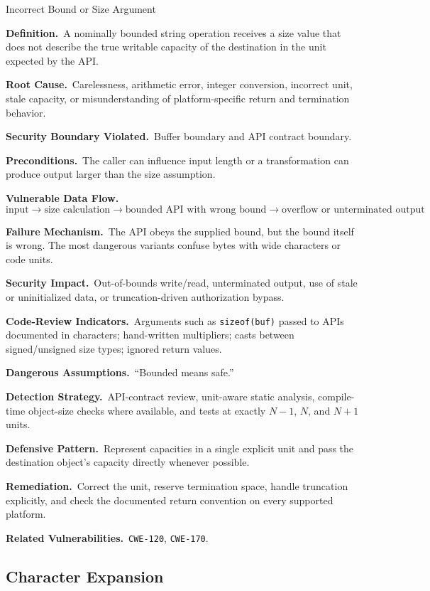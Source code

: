 \documentclass[11pt]{article}
\newcommand{\field}[1]{\par\smallskip\noindent\textbf{#1.}\ }
\newcommand{\cwe}[1]{\texttt{#1}}
\begin{document}
\begin{catalogbox}{Incorrect Bound or Size Argument}
\field{Definition}A nominally bounded string operation receives a size value that does not describe the true writable capacity of the destination in the unit expected by the API.

\field{Root Cause}Carelessness, arithmetic error, integer conversion, incorrect unit, stale capacity, or misunderstanding of platform-specific return and termination behavior.

\field{Security Boundary Violated}Buffer boundary and API contract boundary.

\field{Preconditions}The caller can influence input length or a transformation can produce output larger than the size assumption.

\field{Vulnerable Data Flow}
\[
\text{input} \rightarrow \text{size calculation} \rightarrow
\text{bounded API with wrong bound} \rightarrow \text{overflow or unterminated output}
\]

\field{Failure Mechanism}The API obeys the supplied bound, but the bound itself is wrong. The most dangerous variants confuse bytes with wide characters or code units.

\field{Security Impact}Out-of-bounds write/read, unterminated output, use of stale or uninitialized data, or truncation-driven authorization bypass.

\field{Code-Review Indicators}Arguments such as \texttt{sizeof(buf)} passed to APIs documented in characters; hand-written multipliers; casts between signed/unsigned size types; ignored return values.

\field{Dangerous Assumptions}``Bounded means safe.''

\field{Detection Strategy}API-contract review, unit-aware static analysis, compile-time object-size checks where available, and tests at exactly \(N-1\), \(N\), and \(N+1\) units.

\field{Defensive Pattern}Represent capacities in a single explicit unit and pass the destination object's capacity directly whenever possible.

\field{Remediation}Correct the unit, reserve termination space, handle truncation explicitly, and check the documented return convention on every supported platform.

\field{Related Vulnerabilities}\cwe{CWE-120}, \cwe{CWE-170}.
\end{catalogbox}
\clearpage

\subsection{Character Expansion}
\end{document}
